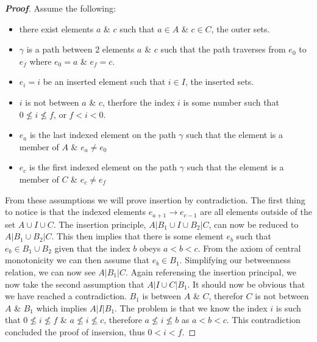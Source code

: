 \documentclass[a4paper,man,natbib]{apa6}
\begin{document}
\begin{proof}[\textbf{Proof}]

      Assume the following:

      \begin{itemize}

            \item there exist elements $ a $ \& $ c $ such that $ a \in A $ \& $ c \in C $, the outer sets.
      
            \item $ \gamma $ is a path between 2 elements $ a $ \& $ c $ such that the path traverses from $ e_0 $ to $ e_f $ where $ e_0 = a $ \& $ e_f = c $.
      
            \item $ e_i = i $ be an inserted element such that $ i \in I $, the inserted sets. 
      
            \item $ i $ is not between $ a $ \& $ c $, therfore the index $ i $ is some number such that $ 0 \nleq i \nleq f $, or $ f < i < 0 $.
      
            \item $ e_a $ is the last indexed element on the path $ \gamma $ such that the element is a member of $ A $ \& $ e_a \neq e_0 $
            \item $ e_c $ is the first indexed element on the path $ \gamma $ such that the element is a member of $ C $ \& $ e_c \neq e_f $

      \end{itemize}

      \noindent
      From these assumptions we will prove insertion by contradiction. 
      The first thing to notice is that the indexed elements $ e_{a+1} \to e_{c-1} $ are all elements outside of the set $ A \cup I \cup C $. 
      The insertion principle, $ A | B_1 \cup I \cup B_2 | C $, can now be reduced to $ A | B_1 \cup B_2 | C $. 
      This then implies that there is some element $ e_b $ such that $ e_b \in B_1 \cup B_2 $ given that the index $ b $ obeys $ a < b < c $. 
      From the axiom of central monotonicity we can then assume that $ e_b \in B_1 $. 
      Simplifying our betweenness relation, we can now see $ A | B_1 | C $.
      Again referensing the insertion principal, we now take the second assumption that $ A | I \cup C | B_1 $.
      It should now be obvious that we have reached a contradiction. 
      $ B_1 $ is between $ A $ \& $ C $, therefor $ C $ is not between $ A $ \& $ B_1 $ which implies $ A | I | B_1 $. 
      The problem is that we know the index $ i $ is such that $ 0 \nleq i \nleq f $ \& $ a \nleq i \nleq c $, therefore $ a \nleq i \nleq b $ as $ a < b < c $.
      This contradiction concluded the proof of insersion, thus $ 0 < i < f $.

\end{proof}
\end{document}
